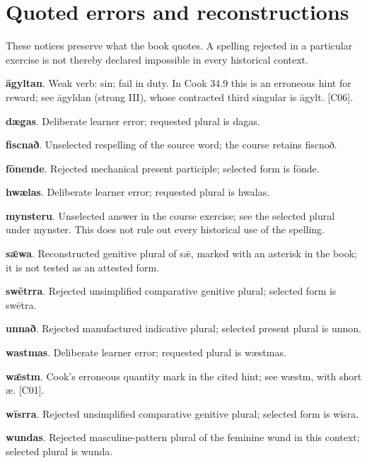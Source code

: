 \section*{Quoted errors and reconstructions}
These notices preserve what the book quotes. A spelling rejected in a particular exercise is not thereby declared impossible in every historical context.\par
\textbf{āgyltan}. Weak verb: sin; fail in duty. In Cook 34.9 this is an erroneous hint for reward; see āgyldan (strong III), whose contracted third singular is āgylt. [C06].\par
\textbf{dægas}. Deliberate learner error; requested plural is dagas.\par
\textbf{fiscnað}. Unselected respelling of the source word; the course retains fiscnoð.\par
\textbf{fōnende}. Rejected mechanical present participle; selected form is fōnde.\par
\textbf{hwælas}. Deliberate learner error; requested plural is hwalas.\par
\textbf{mynsteru}. Unselected answer in the course exercise; see the selected plural under mynster. This does not rule out every historical use of the spelling.\par
\textbf{sǣwa}. Reconstructed genitive plural of sǣ, marked with an asterisk in the book; it is not tested as an attested form.\par
\textbf{swētrra}. Rejected unsimplified comparative genitive plural; selected form is swētra.\par
\textbf{unnað}. Rejected manufactured indicative plural; selected present plural is unnon.\par
\textbf{wastmas}. Deliberate learner error; requested plural is wæstmas.\par
\textbf{wǣstm}. Cook’s erroneous quantity mark in the cited hint; see wæstm, with short æ. [C01].\par
\textbf{wīsrra}. Rejected unsimplified comparative genitive plural; selected form is wīsra.\par
\textbf{wundas}. Rejected masculine-pattern plural of the feminine wund in this context; selected plural is wunda.\par

